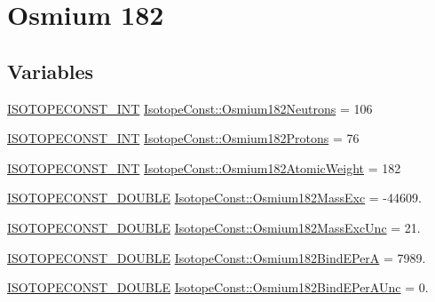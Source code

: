 \hypertarget{group___isotope_const-_osmium-_os182}{}\section{Osmium 182}
\label{group___isotope_const-_osmium-_os182}
\subsection*{Variables}
\begin{DoxyCompactItemize}
\item 
\mbox{\hyperlink{group___isotope_const-_macros_ga5f18360b3e99483a35c32d789e62621c}{I\+S\+O\+T\+O\+P\+E\+C\+O\+N\+S\+T\+\_\+\+I\+NT}} \mbox{\hyperlink{group___isotope_const-_osmium-_os182_ga84ed8020e77f187cc14c9acd80e9a842}{Isotope\+Const\+::\+Osmium182\+Neutrons}} = 106
\item 
\mbox{\hyperlink{group___isotope_const-_macros_ga5f18360b3e99483a35c32d789e62621c}{I\+S\+O\+T\+O\+P\+E\+C\+O\+N\+S\+T\+\_\+\+I\+NT}} \mbox{\hyperlink{group___isotope_const-_osmium-_os182_gad20a5b4bb919ec5e5eb0d1d548baabfb}{Isotope\+Const\+::\+Osmium182\+Protons}} = 76
\item 
\mbox{\hyperlink{group___isotope_const-_macros_ga5f18360b3e99483a35c32d789e62621c}{I\+S\+O\+T\+O\+P\+E\+C\+O\+N\+S\+T\+\_\+\+I\+NT}} \mbox{\hyperlink{group___isotope_const-_osmium-_os182_ga22bb9ff2a72cc47c3e4f3c06560adcf2}{Isotope\+Const\+::\+Osmium182\+Atomic\+Weight}} = 182
\item 
\mbox{\hyperlink{group___isotope_const-_macros_ga8f45a7272ce02c0b4c65c44636ed719a}{I\+S\+O\+T\+O\+P\+E\+C\+O\+N\+S\+T\+\_\+\+D\+O\+U\+B\+LE}} \mbox{\hyperlink{group___isotope_const-_osmium-_os182_ga1f87150d501e1ffe71c71a24668710f0}{Isotope\+Const\+::\+Osmium182\+Mass\+Exc}} = -\/44609.
\item 
\mbox{\hyperlink{group___isotope_const-_macros_ga8f45a7272ce02c0b4c65c44636ed719a}{I\+S\+O\+T\+O\+P\+E\+C\+O\+N\+S\+T\+\_\+\+D\+O\+U\+B\+LE}} \mbox{\hyperlink{group___isotope_const-_osmium-_os182_gadd7052991671f339adc6736b855aba05}{Isotope\+Const\+::\+Osmium182\+Mass\+Exc\+Unc}} = 21.
\item 
\mbox{\hyperlink{group___isotope_const-_macros_ga8f45a7272ce02c0b4c65c44636ed719a}{I\+S\+O\+T\+O\+P\+E\+C\+O\+N\+S\+T\+\_\+\+D\+O\+U\+B\+LE}} \mbox{\hyperlink{group___isotope_const-_osmium-_os182_ga4b0c35ab2b7647cdff193ee0cdacb994}{Isotope\+Const\+::\+Osmium182\+Bind\+E\+PerA}} = 7989.
\item 
\mbox{\hyperlink{group___isotope_const-_macros_ga8f45a7272ce02c0b4c65c44636ed719a}{I\+S\+O\+T\+O\+P\+E\+C\+O\+N\+S\+T\+\_\+\+D\+O\+U\+B\+LE}} \mbox{\hyperlink{group___isotope_const-_osmium-_os182_ga1a1bf01d146a30e430b29396e5f8de04}{Isotope\+Const\+::\+Osmium182\+Bind\+E\+Per\+A\+Unc}} = 0.

\end{DoxyCompactItemize}
